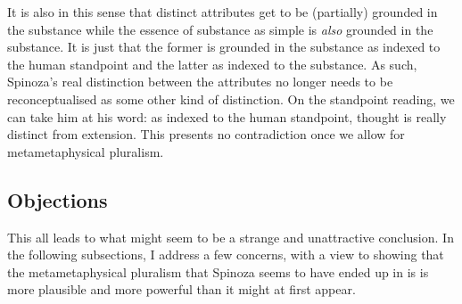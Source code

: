 \documentclass[11pt]{article}
\begin{document}
	It is also in this sense that distinct attributes get to be (partially) grounded in the substance while the essence of substance as simple is \emph{also} grounded in the substance. It is just that the former is grounded in the substance as indexed to the human standpoint and the latter as indexed to the substance. As such, Spinoza's real distinction between the attributes no longer needs to be reconceptualised as some other kind of distinction. On the standpoint reading, we can take him at his word: as indexed to the human standpoint, thought is really distinct from extension. This presents no contradiction once we allow for metametaphysical pluralism.
	
	
	
	

	\subsection{Objections} \label{sec:Obj}
	
	This all leads to what might seem to be a strange and unattractive conclusion. In the following subsections, I address a few concerns, with a view to showing that the metametaphysical pluralism that Spinoza seems to have ended up in is is more plausible and more powerful than it might at first appear.
	
\end{document}
